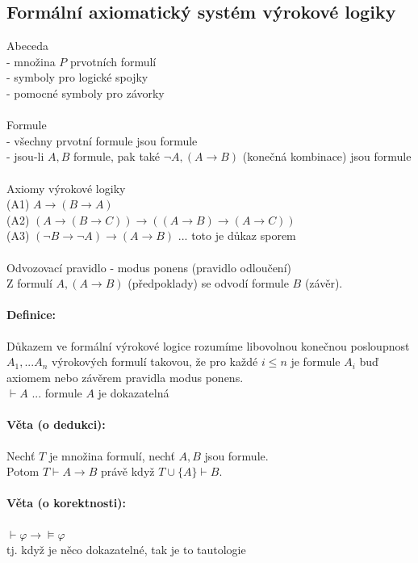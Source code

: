 \documentclass[a4]{report}
\theoremstyle{definition}
\begin{document}
\subsection*{Formální axiomatický systém výrokové logiky}
Abeceda\\
- množina $P$ prvotních formulí\\
- symboly pro logické spojky\\
- pomocné symboly pro závorky\\~\\
Formule\\
- všechny prvotní formule jsou formule\\
- jsou-li $A, B$ formule, pak také $\neg A, (A \rightarrow B)$ (konečná kombinace) jsou formule\\~\\
Axiomy výrokové logiky\\
(A1) $A \rightarrow (B \rightarrow A)$\\
(A2) $(A \rightarrow (B \rightarrow C)) \rightarrow (( A\rightarrow B) \rightarrow (A\rightarrow C)) $\\
(A3) $ (\neg B \rightarrow \neg A) \rightarrow (A\rightarrow B)$ ... toto je důkaz sporem\\~\\
Odvozovací pravidlo - modus ponens (pravidlo odloučení)\\
Z formulí $A, (A \rightarrow B)$ (předpoklady) se odvodí formule $B$ (závěr).

\paragraph*{Definice:}
Důkazem ve formální výrokové logice rozumíme libovolnou konečnou posloupnost $A_1 ,... A_n $ výrokových formulí takovou, že pro každé $i \leq n$ je formule $A_i$ buď axiomem nebo závěrem pravidla modus ponens.\\
$\vdash A$ ... formule $A$ je dokazatelná

\paragraph*{Věta (o dedukci):}
Nechť $T$ je množina formulí, nechť $A, B$ jsou formule.\\
Potom $T \vdash A \rightarrow B$ právě když $T \cup \{ A \} \vdash B$.

\paragraph*{Věta (o korektnosti):}
$\vdash \varphi \rightarrow \models \varphi$\\
tj. když je něco dokazatelné, tak je to tautologie
\end{document}
